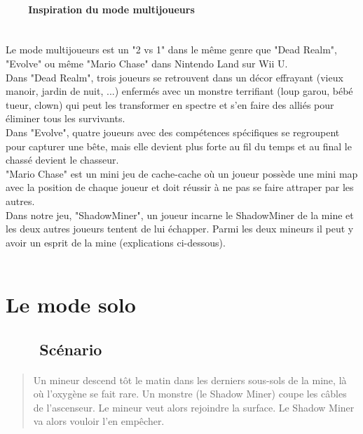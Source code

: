 \documentclass[titlepage, 13px, a4paper]{report}
\begin{document}
\paragraph[Inspiration du mode multijoueurs]{~~~~Inspiration du mode multijoueurs} \hspace{0pt} \\
Le mode multijoueurs est un "2 vs 1" dans le même genre que "Dead Realm", "Evolve" 
ou même "Mario Chase" dans Nintendo Land sur Wii U. 
\\
Dans "Dead Realm", trois joueurs se retrouvent dans un décor effrayant (vieux manoir, jardin de nuit, ...) enfermés 
avec un monstre terrifiant (loup garou, bébé tueur, clown) qui peut les transformer 
en spectre et s'en faire des alliés pour éliminer tous les survivants. 
\\
Dans "Evolve", quatre joueurs avec des compétences spécifiques se regroupent pour capturer 
une bête, mais elle devient plus forte au fil du temps et au final le chassé devient le chasseur. 
\\
"Mario Chase" est un mini jeu de cache-cache où un joueur possède une mini map 
avec la position de chaque joueur et doit réussir à ne pas se faire attraper par les autres. 
\\
Dans notre jeu, "ShadowMiner", un joueur incarne le ShadowMiner de la mine et les deux autres 
joueurs tentent de lui échapper. Parmi les deux mineurs il peut y avoir un esprit de la mine (explications ci-dessous). \\ \\


\section{Le mode solo}

\subsection[Scénario]{~~~~Scénario}
\paragraph*{} \hspace{0pt}
\begin{quotation}
	Un mineur descend tôt le matin dans les derniers sous-sols de la mine, là où l’oxygène se fait rare. 
	Un monstre (le Shadow Miner) coupe les câbles de l’ascenseur. 
	Le mineur veut alors rejoindre la surface. Le Shadow Miner va alors vouloir l’en empêcher. \\
\end{quotation}
\end{document}
